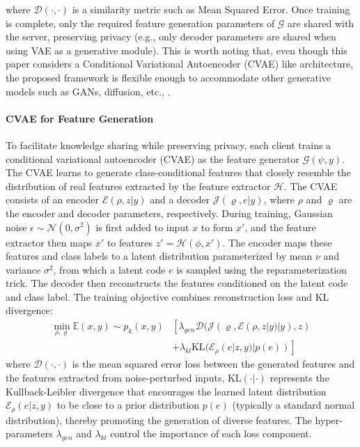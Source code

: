 \documentclass[lettersize,journal]{IEEEtran}
\begin{document}
where $\mathcal{D}(\cdot, \cdot)$ is a similarity metric such as Mean Squared Error. Once training is complete, only the required feature generation parameters of $\mathcal{G}$ are shared with the server, preserving privacy (e.g., only decoder parameters are shared when using VAE as a generative module). This is worth noting that, even though this paper considers a Conditional Variational Autoencoder (CVAE) like architecture, the proposed framework is flexible enough to accommodate other generative models such as GANs, diffusion, etc., \cite{10.1145/3422622, ho2020denoisingdiffusionprobabilisticmodels}.


\noindent\paragraph*{CVAE for Feature Generation}
To facilitate knowledge sharing while preserving privacy, each client trains a conditional variational autoencoder (CVAE) as the feature generator $\mathcal{G}(\psi, y)$. The CVAE learns to generate class-conditional features that closely resemble the distribution of real features extracted by the feature extractor $\mathcal{H}$. The CVAE consists of an encoder $\mathcal{E}(\rho, z|y)$ and a decoder $\mathcal{J}(\varrho, e|y)$, where $\rho$ and $\varrho$ are the encoder and decoder parameters, respectively.
During training, Gaussian noise $\epsilon \sim \mathcal{N}(0, \sigma^2)$ is first added to input $x$ to form $x'$, and the feature extractor then maps $x'$ to features $z'=\mathcal{H}(\phi, x')$. The encoder maps these features and class labels to a latent distribution parameterized by mean $\nu$ and variance $\sigma^2$, from which a latent code $e$ is sampled using the reparameterization trick. The decoder then reconstructs the features conditioned on the latent code and class label.
The training objective combines reconstruction loss and KL divergence:
\begin{align}
\min_{\rho, \varrho} \mathbb{E}{(x, y) \sim p_k(x, y)} & \left[ \lambda_{gen}\mathcal{D}(\mathcal{J}(\varrho, \mathcal{E}(\rho,z|y)|y), z) \right. \\ \nonumber
&+ \left. \lambda_{kl}\text{KL}(\mathcal{E}_{\rho}(e|z,y) | p(e))  \right]
\end{align}
where $\mathcal{D}(\cdot, \cdot)$ is the mean squared error loss between the generated features and the features extracted from noise-perturbed inputs, $\text{KL}(\cdot | \cdot)$ represents the Kullback-Leibler divergence that encourages the learned latent distribution $\mathcal{E}_{\rho}(e|z,y)$ to be close to a prior distribution $p(e)$ (typically a standard normal distribution), thereby promoting the generation of diverse features. The hyper-parameters $\lambda_{gen}$ and $\lambda_{kl}$ control the importance of each loss component.
\end{document}
